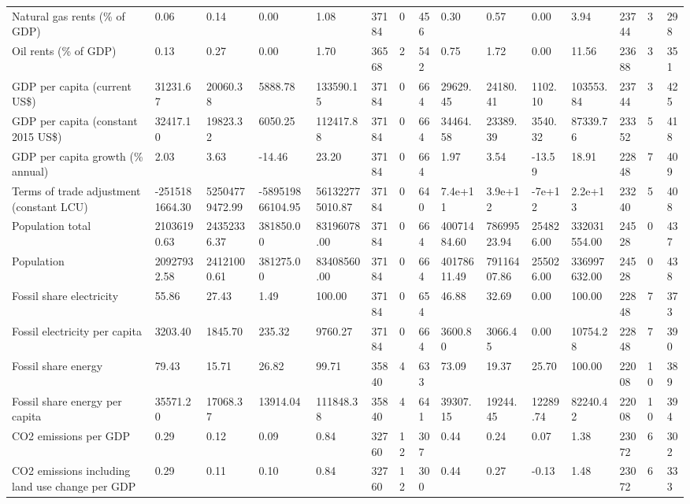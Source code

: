 \begin{longtable}{lllllllllllllll}
\addlinespace
Natural gas rents (\% of GDP) & 0.06 & 0.14 & 0.00 & 1.08 & 37184 & 0 & 456 & 0.30 & 0.57 & 0.00 & 3.94 & 23744 & 3 & 298\\
Oil rents (\% of GDP) & 0.13 & 0.27 & 0.00 & 1.70 & 36568 & 2 & 542 & 0.75 & 1.72 & 0.00 & 11.56 & 23688 & 3 & 351\\
GDP per capita (current US\$) & 31231.67 & 20060.38 & 5888.78 & 133590.15 & 37184 & 0 & 664 & 29629.45 & 24180.41 & 1102.10 & 103553.84 & 23744 & 3 & 425\\
GDP per capita (constant 2015 US\$) & 32417.10 & 19823.32 & 6050.25 & 112417.88 & 37184 & 0 & 664 & 34464.58 & 23389.39 & 3540.32 & 87339.76 & 23352 & 5 & 418\\
GDP per capita growth (\% annual) & 2.03 & 3.63 & -14.46 & 23.20 & 37184 & 0 & 664 & 1.97 & 3.54 & -13.59 & 18.91 & 22848 & 7 & 409\\
\addlinespace
Terms of trade adjustment (constant LCU) & -2515181664.30 & 52504779472.99 & -589519866104.95 & 561322775010.87 & 37184 & 0 & 640 & 7.4e+11 & 3.9e+12 & -7e+12 & 2.2e+13 & 23240 & 5 & 408\\
Population total & 21036190.63 & 24352336.37 & 381850.00 & 83196078.00 & 37184 & 0 & 664 & 40071484.60 & 78699523.94 & 254826.00 & 332031554.00 & 24528 & 0 & 437\\
Population & 20927932.58 & 24121000.61 & 381275.00 & 83408560.00 & 37184 & 0 & 664 & 40178611.49 & 79116407.86 & 255026.00 & 336997632.00 & 24528 & 0 & 438\\
Fossil share electricity & 55.86 & 27.43 & 1.49 & 100.00 & 37184 & 0 & 654 & 46.88 & 32.69 & 0.00 & 100.00 & 22848 & 7 & 373\\
Fossil electricity per capita & 3203.40 & 1845.70 & 235.32 & 9760.27 & 37184 & 0 & 664 & 3600.80 & 3066.45 & 0.00 & 10754.28 & 22848 & 7 & 390\\
\addlinespace
Fossil share energy & 79.43 & 15.71 & 26.82 & 99.71 & 35840 & 4 & 633 & 73.09 & 19.37 & 25.70 & 100.00 & 22008 & 10 & 389\\
Fossil share energy per capita & 35571.20 & 17068.37 & 13914.04 & 111848.38 & 35840 & 4 & 641 & 39307.15 & 19244.45 & 12289.74 & 82240.42 & 22008 & 10 & 394\\
CO2 emissions per GDP & 0.29 & 0.12 & 0.09 & 0.84 & 32760 & 12 & 307 & 0.44 & 0.24 & 0.07 & 1.38 & 23072 & 6 & 302\\
CO2 emissions including land use change per GDP & 0.29 & 0.11 & 0.10 & 0.84 & 32760 & 12 & 300 & 0.44 & 0.27 & -0.13 & 1.48 & 23072 & 6 & 333\\

\end{longtable}
